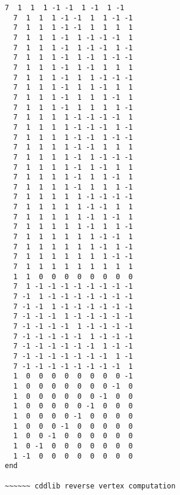 \documentclass[%
 showpacs,
 showkeys,
 preprintnumbers,
 amsmath,amssymb,
 aps,
  pra,
  longbibliography,
 floatfix,
 ]{revtex4-1}
\begin{document}
{\begin{lstlisting}[backgroundcolor=\color{yellow!10},framerule=0pt,breaklines=true, frame=tb]
  7  1  1  1 -1 -1  1 -1  1 -1
  7  1  1  1 -1 -1  1  1 -1 -1
  7  1  1  1 -1 -1  1  1  1  1
  7  1  1  1 -1  1 -1 -1 -1  1
  7  1  1  1 -1  1 -1 -1  1 -1
  7  1  1  1 -1  1 -1  1 -1 -1
  7  1  1  1 -1  1 -1  1  1  1
  7  1  1  1 -1  1  1 -1 -1 -1
  7  1  1  1 -1  1  1 -1  1  1
  7  1  1  1 -1  1  1  1 -1  1
  7  1  1  1 -1  1  1  1  1 -1
  7  1  1  1  1 -1 -1 -1 -1  1
  7  1  1  1  1 -1 -1 -1  1 -1
  7  1  1  1  1 -1 -1  1 -1 -1
  7  1  1  1  1 -1 -1  1  1  1
  7  1  1  1  1 -1  1 -1 -1 -1
  7  1  1  1  1 -1  1 -1  1  1
  7  1  1  1  1 -1  1  1 -1  1
  7  1  1  1  1 -1  1  1  1 -1
  7  1  1  1  1  1 -1 -1 -1 -1
  7  1  1  1  1  1 -1 -1  1  1
  7  1  1  1  1  1 -1  1 -1  1
  7  1  1  1  1  1 -1  1  1 -1
  7  1  1  1  1  1  1 -1 -1  1
  7  1  1  1  1  1  1 -1  1 -1
  7  1  1  1  1  1  1  1 -1 -1
  7  1  1  1  1  1  1  1  1  1
  1  1  0  0  0  0  0  0  0  0
  7  1 -1 -1 -1 -1 -1 -1 -1 -1
  7 -1  1 -1 -1 -1 -1 -1 -1 -1
  7 -1 -1  1 -1 -1 -1 -1 -1 -1
  7 -1 -1 -1  1 -1 -1 -1 -1 -1
  7 -1 -1 -1 -1  1 -1 -1 -1 -1
  7 -1 -1 -1 -1 -1  1 -1 -1 -1
  7 -1 -1 -1 -1 -1 -1  1 -1 -1
  7 -1 -1 -1 -1 -1 -1 -1  1 -1
  7 -1 -1 -1 -1 -1 -1 -1 -1  1
  1  0  0  0  0  0  0  0  0 -1
  1  0  0  0  0  0  0  0 -1  0
  1  0  0  0  0  0  0 -1  0  0
  1  0  0  0  0  0 -1  0  0  0
  1  0  0  0  0 -1  0  0  0  0
  1  0  0  0 -1  0  0  0  0  0
  1  0  0 -1  0  0  0  0  0  0
  1  0 -1  0  0  0  0  0  0  0
  1 -1  0  0  0  0  0  0  0  0
end

~~~~~~ cddlib reverse vertex computation



\end{lstlisting}}
\end{document}
